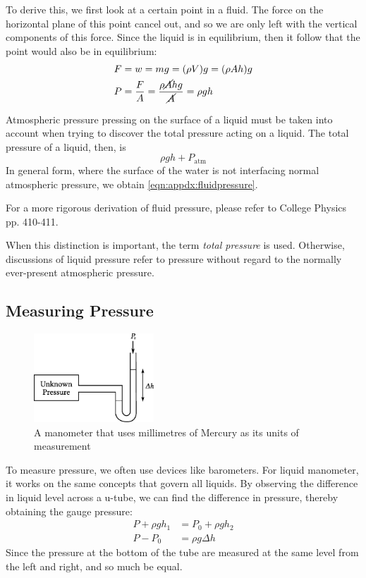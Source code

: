 \documentclass[11pt]{article}
\numberwithin{equation}{section}
\begin{document}
\begin{appendices}
			To derive this, we first look at a certain point in a fluid. The force on the horizontal plane of this point cancel out, and so we are only left with the vertical components of this force. Since the liquid is in equilibrium, then it follow that the point would also be in equilibrium:
			\begin{align*}
				F &= w = mg = (\rho V) g = (\rho Ah)g \\
				P &= \frac{F}{A} = \frac{\rho \cancel{A}hg}{\cancel{A}} = \rho gh
			\end{align*}
			
			Atmospheric pressure pressing on the surface of a liquid must be taken into account when trying to discover the total pressure acting on a liquid. The total pressure of a liquid, then, is 
			\begin{equation*}
				\rho gh + P_{\text{atm}}
			\end{equation*}
			In general form, where the surface of the water is not interfacing normal atmospheric pressure, we obtain \eqref{eqn:appdx:fluidpressure}.
			
			For a more rigorous derivation of fluid pressure, please refer to College Physics pp. 410-411.
			
			When this distinction is important, the term \textit{total pressure} is used. Otherwise, discussions of liquid pressure refer to pressure without regard to the normally ever-present atmospheric pressure.
			
			\subsection{Measuring Pressure}
			
			\begin{figure}
				\centering
				\vspace{-0.7cm}
				\includegraphics[width=4.5cm]{barometer.eps}
				\caption{A manometer that uses millimetres of Mercury as its units of measurement}
				\vspace{-0.5cm}
			\end{figure}
		
			To measure pressure, we often use devices like barometers. For liquid manometer, it works on the same concepts that govern all liquids. By observing the difference in liquid level across a u-tube, we can find the difference in pressure, thereby obtaining the gauge pressure:
			\begin{align*}
				P + \rho g h_1 &= P_0 + \rho g h_2 \\
				P - P_0 &= \rho g \Delta h
			\end{align*}			
			Since the pressure at the bottom of the tube are measured at the same level from the left and right, and so much be equal.
			

\end{appendices}
\end{document}
